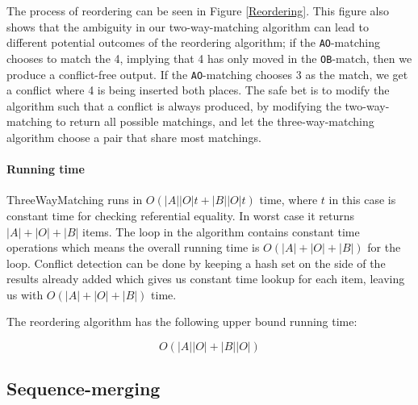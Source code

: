 \documentclass[11pt]{article}
\begin{document}
The process of reordering can be seen in Figure \ref{Reordering}. This figure also shows that the ambiguity in our two-way-matching algorithm can lead to different potential outcomes of the reordering algorithm; if the \texttt{AO}-matching chooses to match the 4, implying that 4 has only moved in the \texttt{OB}-match, then we produce a conflict-free output. If the \texttt{AO}-matching chooses 3 as the match, we get a conflict where 4 is being inserted both places. The safe bet is to modify the algorithm such that a conflict is always produced, by modifying the two-way-matching to return all possible matchings, and let the three-way-matching algorithm choose a pair that share most matchings.

\paragraph{Running time} ThreeWayMatching runs in $O(|A||O| t + |B||O| t)$ time, where $t$ in this case is constant time for checking referential equality. In worst case it returns $|A|+|O|+|B|$ items. The loop in the algorithm contains constant time operations which means the overall running time is $O(|A|+|O|+|B|)$ for the loop. Conflict detection can be done by keeping a hash set on the side of the results already added which gives us constant time lookup for each item, leaving us with $O(|A|+|O|+|B|)$ time.

The reordering algorithm has the following upper bound running time:

\begin{equation}
O(|A||O| + |B||O|) \nonumber
\end{equation}


\subsection{Sequence-merging}
\label{SequenceMerging}
\end{document}
